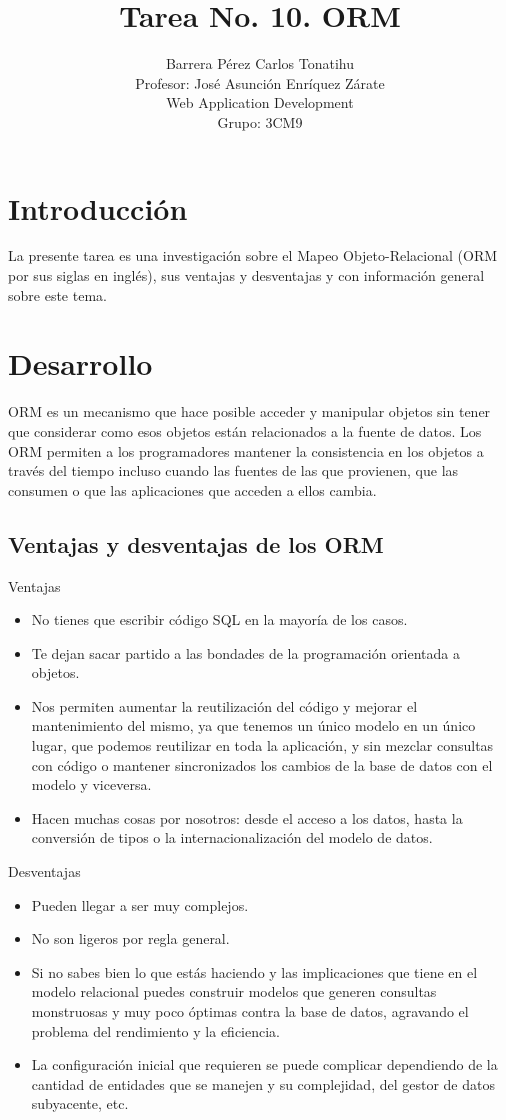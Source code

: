 \documentclass[a4paper,12pt]{article}
\title{Tarea No. 10. ORM}
\author{Barrera Pérez Carlos Tonatihu \\ Profesor: José Asunción Enríquez 
Zárate \\ Web Application Development \\ Grupo: 3CM9 }
\begin{document}
\maketitle
\newpage
\tableofcontents
\newpage

\section{Introducción}
La presente tarea es una investigación sobre el Mapeo Objeto-Relacional (ORM 
por sus siglas en inglés), sus ventajas y desventajas y con información general 
sobre este tema.
\section{Desarrollo}
ORM es un mecanismo que hace posible acceder y manipular objetos sin tener que 
considerar como esos objetos están relacionados a la fuente de datos. Los ORM 
permiten a los programadores mantener la consistencia en los objetos a través 
del tiempo incluso cuando las fuentes de las que provienen, que las consumen o 
que las aplicaciones que acceden a ellos cambia. \cite{search}

\subsection{Ventajas y desventajas de los ORM}
Ventajas
\begin{itemize}
 \item No tienes que escribir código SQL en la mayoría de los casos.
 \item Te dejan sacar partido a las bondades de la programación orientada a 
objetos.
 \item Nos permiten aumentar la reutilización del código y mejorar el 
mantenimiento del mismo, ya que tenemos un único modelo en un único lugar, 
que podemos reutilizar en toda la aplicación, y sin mezclar consultas con 
código o mantener sincronizados los cambios de la base de datos con el modelo 
y viceversa. 
 \item Hacen muchas cosas por nosotros: desde el acceso a los datos, hasta 
la conversión de tipos o la internacionalización del modelo de datos. \cite{orm}
\end{itemize}
Desventajas
\begin{itemize}
 \item Pueden llegar a ser muy complejos.
 \item No son ligeros por regla general.
 \item Si no sabes bien lo que estás haciendo y las implicaciones que tiene en 
el modelo relacional puedes construir modelos que generen consultas monstruosas 
y muy poco óptimas contra la base de datos, agravando el problema del 
rendimiento y la eficiencia.
 \item La configuración inicial que requieren se puede complicar dependiendo 
de la cantidad de entidades que se manejen y su complejidad, del gestor de 
datos subyacente, etc. \cite{orm}
\end{itemize}
\end{document}

